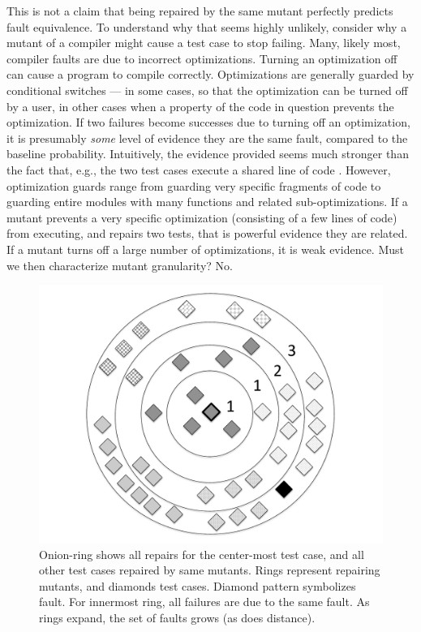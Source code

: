 This is not a claim that being repaired by the same mutant perfectly predicts fault equivalence.  To understand why that seems highly unlikely, consider why a mutant of a compiler might cause a test case to stop failing.  Many, likely most, compiler faults are due to incorrect optimizations.  Turning an optimization off can cause a program to compile correctly.  Optimizations are generally guarded by conditional switches --- in some cases, so that the optimization can be turned off by a user, in other cases when a property of the code in question prevents the optimization.  If two failures become successes due to turning off an optimization, it is presumably \emph{some} level of evidence they are the same fault, compared to the baseline probability.  Intuitively, the evidence provided seems much stronger than the fact that, e.g., the two test cases execute a shared line of code \cite{RepsSpectra}.  However, optimization guards range from guarding very specific fragments of code to guarding entire modules with many functions and related sub-optimizations.  If a mutant prevents a very specific optimization (consisting of a few lines of code) from executing, and repairs two tests, that is powerful evidence they are related.  If a mutant turns off a large number of optimizations, it is weak evidence.  Must we then characterize mutant granularity?  No.

\begin{figure}
\centering
\includegraphics[width=0.4\columnwidth]{onionring}
\caption{\scriptsize{Onion-ring shows all repairs for the center-most test case, and all other test cases repaired by same mutants.  Rings represent repairing mutants, and diamonds test cases.  Diamond pattern symbolizes fault.  For innermost ring, all failures are due to the same fault.  As rings expand, the set of faults grows (as does distance).}}
\vspace{-0.1in}
\label{fig:onion}
\end{figure}

